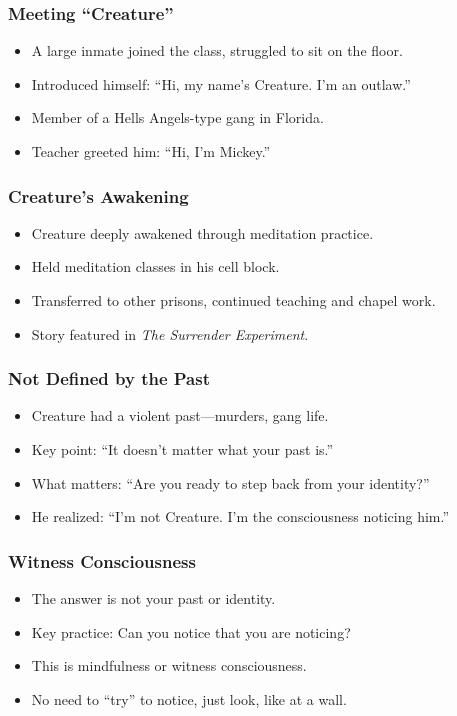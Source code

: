 \begin{frame}[fragile]\frametitle{Meeting “Creature”}
  \begin{itemize}
    \item A large inmate joined the class, struggled to sit on the floor.
    \item Introduced himself: “Hi, my name’s Creature. I’m an outlaw.”
    \item Member of a Hells Angels-type gang in Florida.
    \item Teacher greeted him: “Hi, I’m Mickey.”
  \end{itemize}
\end{frame}

\begin{frame}[fragile]\frametitle{Creature’s Awakening}
  \begin{itemize}
    \item Creature deeply awakened through meditation practice.
    \item Held meditation classes in his cell block.
    \item Transferred to other prisons, continued teaching and chapel work.
    \item Story featured in \textit{The Surrender Experiment}.
  \end{itemize}
\end{frame}

\begin{frame}[fragile]\frametitle{Not Defined by the Past}
  \begin{itemize}
    \item Creature had a violent past—murders, gang life.
    \item Key point: “It doesn’t matter what your past is.”
    \item What matters: “Are you ready to step back from your identity?”
    \item He realized: “I’m not Creature. I’m the consciousness noticing him.”
  \end{itemize}
\end{frame}

\begin{frame}[fragile]\frametitle{Witness Consciousness}
  \begin{itemize}
    \item The answer is not your past or identity.
    \item Key practice: Can you notice that you are noticing?
    \item This is mindfulness or witness consciousness.
    \item No need to “try” to notice, just look, like at a wall.
  \end{itemize}
\end{frame}

